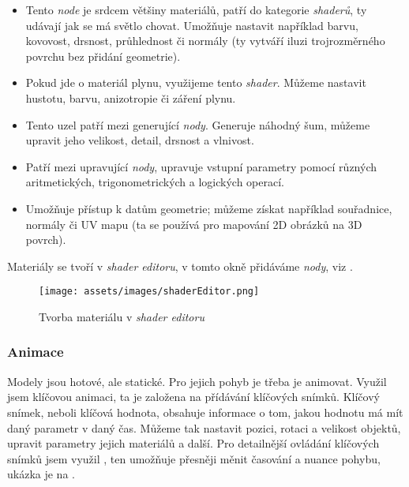 \begin{itemize}
    \item {}\par
        {Tento \textit{node} je srdcem většiny materiálů, patří do kategorie \textit{shaderů}, ty udávají jak se má světlo chovat. Umožňuje nastavit například barvu, kovovost, drsnost, průhlednost či normály (ty vytváří iluzi trojrozměrného povrchu bez přidání geometrie).}
    \item {}\par
        {Pokud jde o materiál plynu, využijeme tento \textit{shader}. Můžeme nastavit hustotu, barvu, anizotropie či záření plynu.}
    \item {}\par
        {Tento uzel patří mezi generující \textit{nody}. Generuje náhodný šum, můžeme upravit jeho velikost, detail, drsnost a vlnivost.}
    \item {}\par
        {Patří mezi upravující \textit{nody}, upravuje vstupní parametry pomocí různých aritmetických, trigonometrických a logických operací.}
    \item {}\par
        {Umožňuje přístup k datům geometrie; můžeme získat například souřadnice, normály či UV mapu (ta se používá pro mapování 2D obrázků na 3D povrch).}
\end{itemize}

{Materiály se tvoří v \textit{shader editoru}, v tomto okně přidáváme \textit{nody}, viz .}

\begin{figure}[H]
    \centering
    \texttt{[image: assets/images/shaderEditor.png]}
    \caption{Tvorba materiálu v \textit{shader editoru} \jaObr}
    \label{obr:shaderEditor}
\end{figure}

\newpage

\subsubsection{Animace}
{Modely jsou hotové, ale statické. Pro jejich pohyb je třeba je animovat. Využil jsem klíčovou animaci, ta je založena na přídávání klíčových snímků. Klíčový snímek, neboli klíčová hodnota, obsahuje informace o tom, jakou hodnotu má mít daný parametr v daný čas. Můžeme tak nastavit pozici, rotaci a velikost objektů, upravit parametry jejich materiálů a další.}\odst
{Pro detailnější ovládání klíčových snímků jsem využil , ten umožňuje přesněji měnit časování a nuance pohybu, ukázka  je na .}


